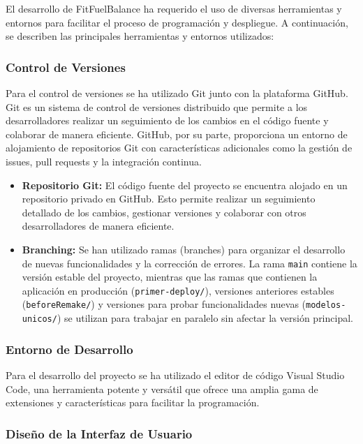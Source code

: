 El desarrollo de FitFuelBalance ha requerido el uso de diversas herramientas y entornos para facilitar el proceso de programación y despliegue. A continuación, se describen las principales herramientas y entornos utilizados:

\subsubsection{Control de Versiones}

Para el control de versiones se ha utilizado Git junto con la plataforma GitHub. Git es un sistema de control de versiones distribuido que permite a los desarrolladores realizar un seguimiento de los cambios en el código fuente y colaborar de manera eficiente. GitHub, por su parte, proporciona un entorno de alojamiento de repositorios Git con características adicionales como la gestión de issues, pull requests y la integración continua.

\begin{itemize}
    \item \textbf{Repositorio Git:} El código fuente del proyecto se encuentra alojado en un repositorio privado en GitHub. Esto permite realizar un seguimiento detallado de los cambios, gestionar versiones y colaborar con otros desarrolladores de manera eficiente.
    \item \textbf{Branching:} Se han utilizado ramas (branches) para organizar el desarrollo de nuevas funcionalidades y la corrección de errores. La rama \texttt{main} contiene la versión estable del proyecto, mientras que las ramas que contienen la aplicación en producción (\texttt{primer-deploy/}), versiones anteriores estables (\texttt{beforeRemake/}) y versiones para probar funcionalidades nuevas (\texttt{modelos-unicos/}) se utilizan para trabajar en paralelo sin afectar la versión principal.
\end{itemize}

\subsubsection{Entorno de Desarrollo}

Para el desarrollo del proyecto se ha utilizado el editor de código Visual Studio Code, una herramienta potente y versátil que ofrece una amplia gama de extensiones y características para facilitar la programación.

\subsubsection{Diseño de la Interfaz de Usuario}


